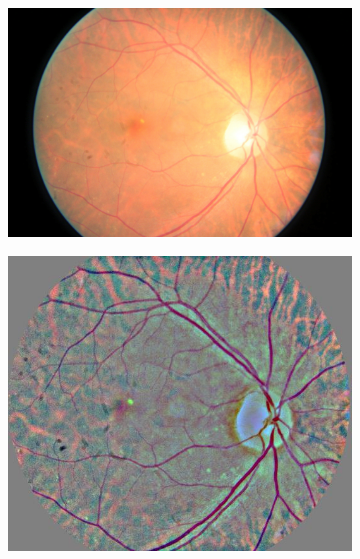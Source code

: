\begin{figure}[tb]
    \bigskip
     \begin{subfigure}[b]{0.24\textwidth}
         \centering
         \includegraphics[width=\textwidth, height=\textwidth]{figures/chapter4/Preprocessing/Ori/41_left.jpeg}
    \end{subfigure}
    \hfill
    \begin{subfigure}[b]{0.24\textwidth}
        \centering
        \includegraphics[width=\textwidth, height=\textwidth]{figures/chapter4/Preprocessing/Prep/41_left_crop.jpeg}

\end{subfigure}
\end{figure}
